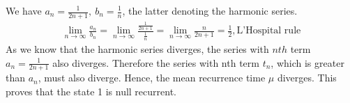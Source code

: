 We have $a_n = \frac{1}{2n+1}, \ b_n = \frac{1}{n}$, the latter denoting the harmonic series.
\begin{gather*}
\lim_{n\to\infty} \frac{a_n}{b_n} = \lim_{n\to\infty} \frac{\frac{1}{2n+1}}{\frac{1}{n}} = \lim_{n\to\infty} \frac{n}{2n+1} = \frac{1}{2}, \text{L'Hospital rule}
\end{gather*}
As we know that the harmonic series diverges, the series with $nth$ term $a_n = \frac{1}{2n+1}$ also diverges. Therefore the series with nth term $t_n$, which is greater than $a_n$, must also diverge. Hence, the mean recurrence time $\mu$ diverges. This proves that the state 1 is null recurrent.